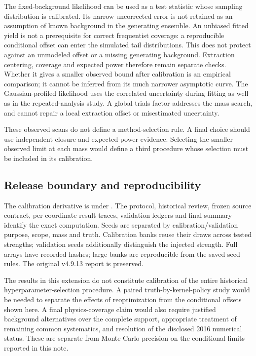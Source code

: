 \documentclass[11pt]{article}
\begin{document}
The fixed-background likelihood can be used as a test statistic whose
sampling distribution is calibrated. Its narrow uncorrected error is not
retained as an assumption of known background in the generating ensemble.
An unbiased fitted yield is not a prerequisite for correct frequentist
coverage: a reproducible conditional offset can enter the simulated tail
distributions. This does not protect against an unmodeled offset or a
missing generating background. Extraction centering, coverage and expected
power therefore remain separate checks.
Whether it gives a smaller observed bound after calibration is an empirical
comparison; it cannot be inferred from its much narrower asymptotic curve.
The Gaussian-profiled likelihood uses the correlated uncertainty during
fitting as well as in the repeated-analysis study. A global trials factor
addresses the mass search, and cannot repair a local extraction offset or
misestimated uncertainty.

These observed scans do not define a method-selection rule. A final choice
should use independent closure and expected-power evidence. Selecting the
smaller observed limit at each mass would define a third procedure whose
selection must be included in its calibration.

\subsection{Release boundary and reproducibility}

The calibration derivative is under
. The protocol, historical
review, frozen source contract, per-coordinate result traces, validation
ledgers and final summary identify the exact computation. Seeds are
separated by calibration/validation purpose, scope, mass and truth.
Calibration banks reuse their draws across tested strengths; validation
seeds additionally distinguish the injected strength.
Full arrays have recorded hashes; large banks are reproducible
from the saved seed rules. The original v4.9.13 report is preserved.

The results in this extension do not constitute calibration of the entire
historical hyperparameter-selection procedure. A paired truth-by-kernel-policy
study would be needed to separate the effects of reoptimization from the
conditional offsets shown here. A final physics-coverage claim would also
require justified background alternatives over the complete support,
appropriate treatment of remaining common systematics, and resolution of
the disclosed 2016 numerical status. These are separate from Monte Carlo
precision on the conditional limits reported in this note.
\end{document}
